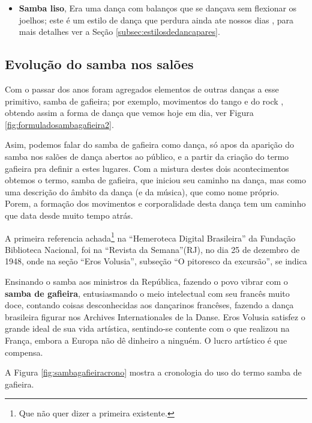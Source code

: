 \begin{itemize}
\item \textbf{Samba liso}, 
Era uma dança com balanços que se dançava sem flexionar os joelhos;
este é um estilo de dança que perdura ainda ate nossos 
dias \cite[pp. 58,62]{freitas1959danca} \cite[pp. 143]{perna2002samba}, 
para mais detalhes ver a Seção \ref{subsec:estilosdedancapares}.
\end{itemize}

\subsection{Evolução do samba nos salões}

Com o passar dos anos foram agregados elementos de outras danças a esse primitivo, samba de gafieira;
por exemplo, movimentos do tango e do rock \cite[pp. 142]{perna2002samba}, 
obtendo assim a forma de dança que vemos hoje em dia, ver Figura \ref{fig:formuladosambagafieira2}.

Asim, podemos falar do samba de gafieira como dança, só apos da aparição do samba nos
salões de dança abertos ao público, e a partir da criação do termo gafieira pra definir a estes lugares.
Com a mistura destes dois acontecimentos obtemos o termo, samba de gafieira,
que iniciou seu caminho na dança, mas como uma descrição do âmbito da dança (e da música), que como nome próprio.
Porem, a formação dos movimentos e corporalidade desta dança tem um caminho que data desde muito tempo atrás.


A primeira referencia achada\footnote{Que não quer dizer a primeira existente.} 
na ``Hemeroteca Digital Brasileira'' da Fundação Biblioteca Nacional,
foi na ``Revista da Semana''(RJ), no dia 25 de dezembro de 1948,
onde na seção ``Eros Volusia'', subseção ``O pitoresco da excursão'', se indica \cite[pp. 48]{sambagafieirarefbn}
\begin{citando}
Ensinando o samba aos ministros da República, 
fazendo o povo vibrar com o \textbf{samba de gafieira}, entusiasmando
o meio intelectual com seu francês muito doce,
contando coisas desconhecidas aos dançarinos francêses,
fazendo a dança brasileira figurar nos Archives Internationales de la Danse.
Eros Volusia satisfez o grande ideal de sua vida artística, sentindo-se contente
com o que realizou na França, embora a Europa não dê dinheiro a ninguém.
O lucro artístico é que compensa.
\end{citando}


A Figura \ref{fig:sambagafieiracrono} mostra a cronologia do uso do termo samba de gafieira. 

